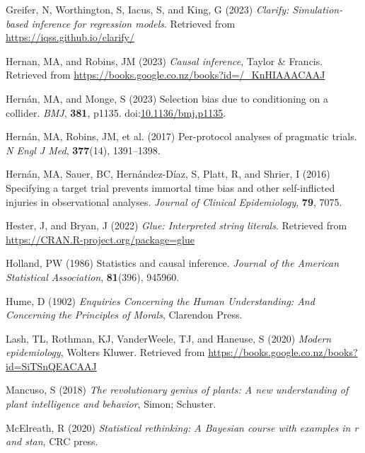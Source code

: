 \documentclass[
  singlecolumn]{article}
\newlength{\cslhangindent}
\newenvironment{CSLReferences}[2] %
 {\begin{list}{}{%
  \setlength{\itemindent}{0pt}
  \setlength{\leftmargin}{0pt}
  \setlength{\parsep}{0pt}
  \ifodd #1
   \setlength{\leftmargin}{\cslhangindent}
   \setlength{\itemindent}{-1\cslhangindent}
  \fi
  \setlength{\itemsep}{#2\baselineskip}}}
 {\end{list}}
\begin{document}
\begin{CSLReferences}{1}{0}
Greifer, N, Worthington, S, Iacus, S, and King, G (2023) \emph{Clarify:
Simulation-based inference for regression models}. Retrieved from
\url{https://iqss.github.io/clarify/}

Hernan, MA, and Robins, JM (2023) \emph{Causal inference}, Taylor \&
Francis. Retrieved from
\url{https://books.google.co.nz/books?id=/_KnHIAAACAAJ}

Hernán, MA, and Monge, S (2023) Selection bias due to conditioning on a
collider. \emph{BMJ}, \textbf{381}, p1135.
doi:\href{https://doi.org/10.1136/bmj.p1135}{10.1136/bmj.p1135}.

Hernán, MA, Robins, JM, et al. (2017) Per-protocol analyses of pragmatic
trials. \emph{N Engl J Med}, \textbf{377}(14), 1391--1398.

Hernán, MA, Sauer, BC, Hernández-Díaz, S, Platt, R, and Shrier, I (2016)
Specifying a target trial prevents immortal time bias and other
self-inflicted injuries in observational analyses. \emph{Journal of
Clinical Epidemiology}, \textbf{79}, 7075.

Hester, J, and Bryan, J (2022) \emph{Glue: Interpreted string literals}.
Retrieved from \url{https://CRAN.R-project.org/package=glue}

Holland, PW (1986) Statistics and causal inference. \emph{Journal of the
American Statistical Association}, \textbf{81}(396), 945960.

Hume, D (1902) \emph{Enquiries Concerning the Human Understanding: And
Concerning the Principles of Morals}, Clarendon Press.

Lash, TL, Rothman, KJ, VanderWeele, TJ, and Haneuse, S (2020)
\emph{Modern epidemiology}, Wolters Kluwer. Retrieved from
\url{https://books.google.co.nz/books?id=SiTSnQEACAAJ}

Mancuso, S (2018) \emph{The revolutionary genius of plants: A new
understanding of plant intelligence and behavior}, Simon; Schuster.

McElreath, R (2020) \emph{Statistical rethinking: A {B}ayesian course
with examples in r and stan}, CRC press.


\end{CSLReferences}
\end{document}

